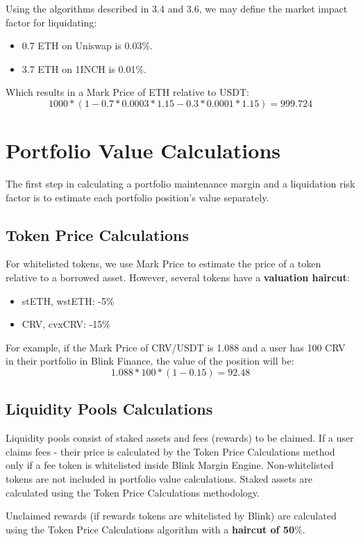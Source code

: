 \documentclass[conference]{IEEEtran}
\begin{document}
Using the algorithms described in 3.4 and 3.6, we may define the market impact factor for liquidating:
\begin{itemize}
	\item 0.7 ETH on Uniswap is 0.03$\%$.
	\item 3.7 ETH on 1INCH is 0.01$\%$.
\end{itemize}

Which results in a Mark Price of ETH relative to USDT:
$$1000*(1-0.7*0.0003*1.15-0.3*0.0001*1.15)=999.724$$

\section{Portfolio Value Calculations}

The first step in calculating a portfolio maintenance margin and a liquidation risk factor is to estimate each portfolio position's value separately.

\subsection{Token Price Calculations}

For whitelisted tokens, we use Mark Price to estimate the price of a token relative to a borrowed asset. However, several tokens have a \textbf{valuation haircut}:

\begin{itemize}
	\item stETH, wstETH: -5$\%$
	\item CRV, cvxCRV: -15$\%$
\end{itemize}


For example, if the Mark Price of CRV/USDT is 1.088 and a user has 100 CRV in their portfolio in Blink Finance, the value of the position will be:
$$1.088 * 100 * (1-0.15)= 92.48$$


\subsection{Liquidity Pools Calculations}
Liquidity pools consist of staked assets and fees (rewards) to be claimed. If a user claims fees - their price is calculated by the Token Price Calculations method only if a fee token is whitelisted inside Blink Margin Engine. Non-whitelisted tokens are not included in portfolio value calculations.
Staked assets are calculated using the Token Price Calculations methodology. 

Unclaimed rewards (if rewards tokens are whitelisted by Blink) are calculated using the Token Price Calculations algorithm with a \textbf{haircut of 50$\%$}.
\end{document}
